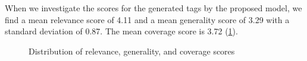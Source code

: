 When we investigate the scores for the generated tags by the proposed model, we find a mean relevance score of 4.11 and a mean generality score of 3.29 with a standard deviation of 0.87. The mean coverage score is 3.72 (\cref{fig:gpt_tag_type_score_distributions}).

\begin{figure}[h]
    \centering
    \hfill
    
    \caption{Distribution of relevance, generality, and coverage scores}
    \label{fig:gpt_tag_type_score_distributions}
\end{figure}

